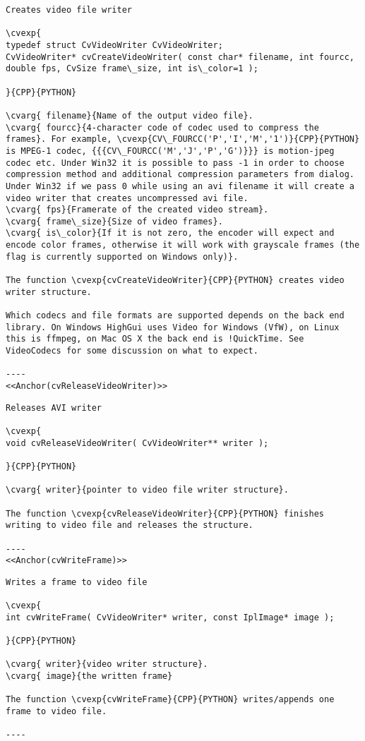 \begin{verbatim}
Creates video file writer

\cvexp{
typedef struct CvVideoWriter CvVideoWriter;
CvVideoWriter* cvCreateVideoWriter( const char* filename, int fourcc, double fps, CvSize frame\_size, int is\_color=1 );

}{CPP}{PYTHON}

\cvarg{ filename}{Name of the output video file}.
\cvarg{ fourcc}{4-character code of codec used to compress the frames}. For example, \cvexp{CV\_FOURCC('P','I','M','1')}{CPP}{PYTHON} is MPEG-1 codec, {{{CV\_FOURCC('M','J','P','G')}}} is motion-jpeg codec etc. Under Win32 it is possible to pass -1 in order to choose compression method and additional compression parameters from dialog. Under Win32 if we pass 0 while using an avi filename it will create a video writer that creates uncompressed avi file.
\cvarg{ fps}{Framerate of the created video stream}.
\cvarg{ frame\_size}{Size of video frames}.
\cvarg{ is\_color}{If it is not zero, the encoder will expect and encode color frames, otherwise it will work with grayscale frames (the flag is currently supported on Windows only)}.

The function \cvexp{cvCreateVideoWriter}{CPP}{PYTHON} creates video writer structure.

Which codecs and file formats are supported depends on the back end library. On Windows HighGui uses Video for Windows (VfW), on Linux this is ffmpeg, on Mac OS X the back end is !QuickTime. See VideoCodecs for some discussion on what to expect.

----
<<Anchor(cvReleaseVideoWriter)>>
\end{verbatim}
\begin{verbatim}
Releases AVI writer

\cvexp{
void cvReleaseVideoWriter( CvVideoWriter** writer );

}{CPP}{PYTHON}

\cvarg{ writer}{pointer to video file writer structure}.

The function \cvexp{cvReleaseVideoWriter}{CPP}{PYTHON} finishes writing to video file and releases the structure.

----
<<Anchor(cvWriteFrame)>>
\end{verbatim}
\begin{verbatim}
Writes a frame to video file

\cvexp{
int cvWriteFrame( CvVideoWriter* writer, const IplImage* image );

}{CPP}{PYTHON}

\cvarg{ writer}{video writer structure}.
\cvarg{ image}{the written frame}

The function \cvexp{cvWriteFrame}{CPP}{PYTHON} writes/appends one frame to video file.

----
\end{verbatim}

